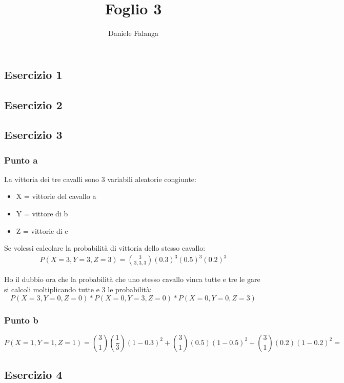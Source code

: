 \documentclass[12pt]{article}
\title{\textbf{Foglio 3}}
\author{Daniele Falanga}
\date{}
\begin{document}
\maketitle

\subsection*{Esercizio 1}


\subsection*{Esercizio 2}



\subsection*{Esercizio 3}
\subsubsection*{Punto a}

La vittoria dei tre cavalli sono 3 variabili aleatorie congiunte:
\begin{itemize}
    \item X = vittorie del cavallo a
    \item Y = vittore di b
    \item Z = vittorie di c
\end{itemize}

Se volessi calcolare la probabilità di vittoria dello stesso cavallo:
\begin{align*}
    P(X=3,Y=3,Z=3) = \binom{3}{3,3,3}\left(0.3\right)^3\left(0.5\right)^3\left(0.2\right)^3
\end{align*}

Ho il dubbio ora che la probabilità che uno stesso cavallo vinca tutte e tre le gare si calcoli moltiplicando tutte e 3 le probabilità:
\[
    P(X=3,Y=0,Z=0) * P(X=0,Y=3,Z=0) * P(X=0,Y=0,Z=3)    
\]

\subsubsection*{Punto b}
\[
    P(X=1,Y=1,Z=1) = \binom{3}{1}\left(\frac{1}{3}\right)\left(1-0.3\right)^2 + \binom{3}{1}\left(0.5\right)\left(1 -0.5\right)^2 + \binom{3}{1}\left(0.2\right) \left(1 - 0.2\right)^2 =    
\]
\subsection*{Esercizio 4}
\end{document}
